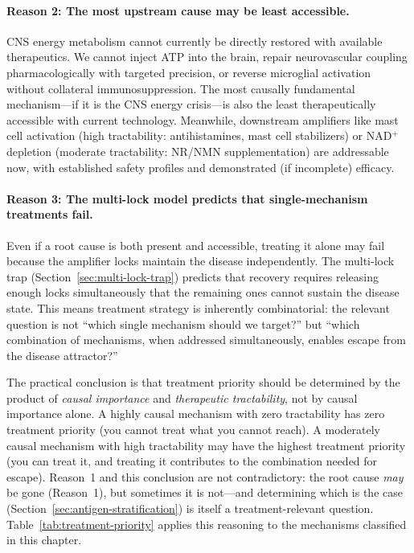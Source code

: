 \paragraph{Reason 2: The most upstream cause may be least accessible.} CNS energy metabolism cannot currently be directly restored with available therapeutics. We cannot inject ATP into the brain, repair neurovascular coupling pharmacologically with targeted precision, or reverse microglial activation without collateral immunosuppression. The most causally fundamental mechanism---if it is the CNS energy crisis---is also the least therapeutically accessible with current technology. Meanwhile, downstream amplifiers like mast cell activation (high tractability: antihistamines, mast cell stabilizers) or NAD$^+$ depletion (moderate tractability: NR/NMN supplementation) are addressable now, with established safety profiles and demonstrated (if incomplete) efficacy.

\paragraph{Reason 3: The multi-lock model predicts that single-mechanism treatments fail.} Even if a root cause is both present and accessible, treating it alone may fail because the amplifier locks maintain the disease independently. The multi-lock trap (Section~\ref{sec:multi-lock-trap}) predicts that recovery requires releasing enough locks simultaneously that the remaining ones cannot sustain the disease state. This means treatment strategy is inherently combinatorial: the relevant question is not ``which single mechanism should we target?'' but ``which combination of mechanisms, when addressed simultaneously, enables escape from the disease attractor?''

The practical conclusion is that treatment priority should be determined by the product of \emph{causal importance} and \emph{therapeutic tractability}, not by causal importance alone. A highly causal mechanism with zero tractability has zero treatment priority (you cannot treat what you cannot reach). A moderately causal mechanism with high tractability may have the highest treatment priority (you can treat it, and treating it contributes to the combination needed for escape). Reason~1 and this conclusion are not contradictory: the root cause \emph{may} be gone (Reason~1), but sometimes it is not---and determining which is the case (Section~\ref{sec:antigen-stratification}) is itself a treatment-relevant question. Table~\ref{tab:treatment-priority} applies this reasoning to the mechanisms classified in this chapter.

